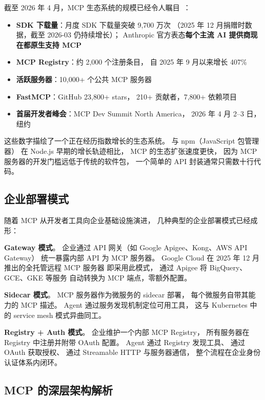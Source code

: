 截至 2026 年 4 月，MCP 生态系统的规模已经令人瞩目~\cite{aaif2026foundation}：
\begin{itemize}[noitemsep]
  \item \textbf{SDK 下载量}：月度 SDK 下载量突破 9,700 万次
        （2025 年 12 月捐赠时数据，截至 2026-03 仍持续增长）；
        Anthropic 官方表态\textbf{每个主流 AI 提供商现在都原生支持 MCP}
  \item \textbf{MCP Registry}：约 2,000 个注册条目，
        自 2025 年 9 月以来增长 407\%
  \item \textbf{活跃服务器}：10,000+ 个公共 MCP 服务器
  \item \textbf{FastMCP}：GitHub 23,800+ stars，
        210+ 贡献者，7,800+ 依赖项目
  \item \textbf{首届开发者峰会}：MCP Dev Summit North America，
        2026 年 4 月 2--3 日，纽约
\end{itemize}

这些数字描绘了一个正在经历指数增长的生态系统。
与 npm（JavaScript 包管理器）
在 Node.js 早期的增长轨迹相比，
MCP 的生态扩张速度更快，
因为 MCP 服务器的开发门槛远低于传统的软件包，
一个简单的 API 封装通常只需数十行代码。

\subsection{企业部署模式}

随着 MCP 从开发者工具向企业基础设施演进，
几种典型的企业部署模式已经成形：

\textbf{Gateway 模式}。
企业通过 API 网关（如 Google Apigee、Kong、AWS API Gateway）
统一暴露内部 API 为 MCP 服务器。
Google Cloud 在 2025 年 12 月推出的全托管远程 MCP 服务器
即采用此模式，
通过 Apigee 将 BigQuery、GCE、GKE 等服务
自动转换为 MCP 端点，零额外配置。

\textbf{Sidecar 模式}。
MCP 服务器作为微服务的 sidecar 部署，
每个微服务自带其能力的 MCP 描述。
Agent 通过服务发现机制定位可用工具，
这与 Kubernetes 中的 service mesh 模式异曲同工。

\textbf{Registry + Auth 模式}。
企业维护一个内部 MCP Registry，
所有服务器在 Registry 中注册并附带 OAuth 配置。
Agent 通过 Registry 发现工具、
通过 OAuth 获取授权、
通过 Streamable HTTP 与服务器通信，
整个流程在企业身份认证体系内闭环。

\subsection{MCP 的深层架构解析}

